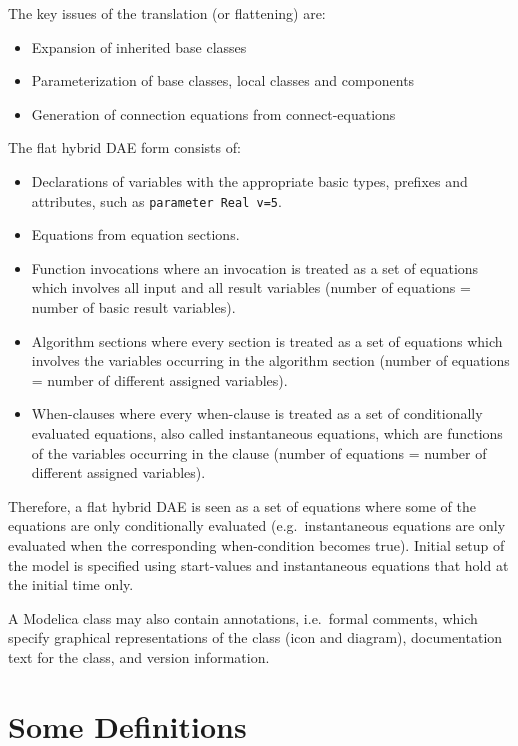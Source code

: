 The key issues of the translation (or flattening) are:
\begin{itemize}
\item
  Expansion of inherited base classes
\item
  Parameterization of base classes, local classes and components
\item
  Generation of connection equations from connect-equations
\end{itemize}

The flat hybrid DAE form consists of:
\begin{itemize}
\item
  Declarations of variables with the appropriate basic types, prefixes
  and attributes, such as \lstinline!parameter Real v=5!.
\item
  Equations from equation sections.
\item
  Function invocations where an invocation is treated as a set of
  equations which involves all input and all result variables (number of
  equations = number of basic result variables).
\item
  Algorithm sections where every section is treated as a set of
  equations which involves the variables occurring in the algorithm
  section (number of equations = number of different assigned
  variables).
\item
  When-clauses where every when-clause is treated as a set of
  conditionally evaluated equations, also called instantaneous
  equations, which are functions of the variables occurring in the
  clause (number of equations = number of different assigned variables).
\end{itemize}

Therefore, a flat hybrid DAE is seen as a set of equations where some of
the equations are only conditionally evaluated (e.g.\ instantaneous
equations are only evaluated when the corresponding when-condition
becomes true). Initial setup of the model is specified using
start-values and instantaneous equations that hold at the initial time
only.

A Modelica class may also contain annotations, i.e.\ formal comments,
which specify graphical representations of the class (icon and diagram),
documentation text for the class, and version information.

\section{Some Definitions}\label{some-definitions}

